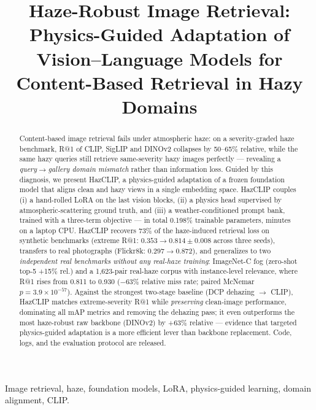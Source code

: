 \documentclass[journal]{IEEEtran}
\title{Haze-Robust Image Retrieval: Physics-Guided Adaptation of Vision--Language Models for Content-Based Retrieval in Hazy Domains}
\author{\IEEEauthorblockN{Ali Hosseini}
\IEEEauthorblockN{Saeed Sedighi\textsuperscript{*}}
\IEEEauthorblockA{Department of Computer Engineering, Shi.C., Islamic Azad University, Shiraz, Iran\\
\{ali.hosseini7148, saeed.sedighi\}@iau.ac.ir}
\IEEEauthorblockA{\textsuperscript{*}Corresponding author: Saeed Sedighi (saeed.sedighi@iau.ac.ir)}
}
\begin{document}
\maketitle

\begin{abstract}
Content-based image retrieval fails under atmospheric haze: on a
severity-graded haze benchmark, R@1 of CLIP, SigLIP and DINOv2 collapses
by 50--65\% relative, while the same hazy queries still retrieve
same-severity hazy images perfectly --- revealing a \emph{query$\rightarrow$gallery
domain mismatch} rather than information loss. Guided by this diagnosis, we
present HazCLIP, a physics-guided adaptation of a frozen foundation
model that aligns clean and hazy views in a single embedding space.
HazCLIP couples (i) a hand-rolled LoRA on the last vision blocks, (ii) a
physics head supervised by atmospheric-scattering ground truth, and (iii) a
weather-conditioned prompt bank, trained with a three-term objective --- in
total 0.198\% trainable parameters, minutes on a laptop CPU.
HazCLIP recovers 73\% of the haze-induced retrieval loss on synthetic
benchmarks (extreme R@1: $0.353\rightarrow0.814\pm0.008$ across three
seeds), transfers to real photographs (Flickr8k: $0.297\rightarrow0.872$),
and generalizes to two \emph{independent real benchmarks without any
real-haze training}: ImageNet-C fog (zero-shot top-5 +15\% rel.) and a
1,623-pair real-haze corpus with instance-level relevance, where R@1 rises
from 0.811 to 0.930 ($-63\%$ relative miss rate; paired McNemar
$p=3.9\times10^{-57}$). Against the strongest two-stage baseline (DCP
dehazing $\rightarrow$ CLIP), HazCLIP matches extreme-severity R@1 while
\emph{preserving} clean-image performance, dominating all mAP metrics and
removing the dehazing pass; it even outperforms the most haze-robust raw
backbone (DINOv2) by +63\% relative --- evidence that targeted
physics-guided adaptation is a more efficient lever than backbone
replacement. Code, logs, and the evaluation protocol are released.
\end{abstract}

\begin{IEEEkeywords}
Image retrieval, haze, foundation models, LoRA, physics-guided learning,
domain alignment, CLIP.
\end{IEEEkeywords}
\end{document}
